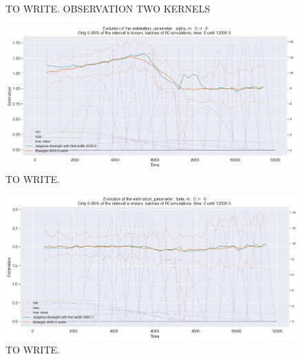 \begin{figure}
\centering
{} 
\caption{TO WRITE. OBSERVATION TWO KERNELS}
\label{fig:TEST}
\end{figure}

\begin{figure}
\centering
\includegraphics[width = 0.90 \textwidth]{../imag/chap3/3/J.png}
\caption{TO WRITE.}
\label{fig:first_estimate_3_alpha}
\end{figure}

\begin{figure}
\centering
\includegraphics[width = 0.90 \textwidth]{../imag/chap3/3/K.png}
\caption{TO WRITE.}
\label{fig:first_estimate_3_beta}
\end{figure}

